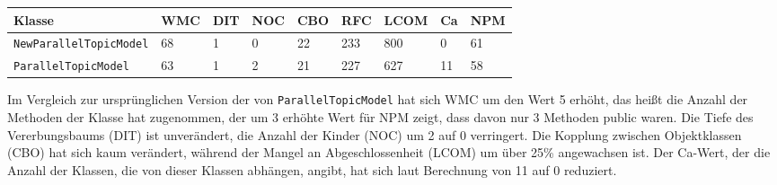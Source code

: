 \documentclass{scrreprt}
\newcommand{\lstx}[1]{\lstinline$#1$}
\begin{document}
\begin{center}
\begin{tabular}{lllllllll}
\toprule
Klasse & WMC & DIT & NOC & CBO & RFC & LCOM & Ca & NPM \\
\midrule
\lstx{NewParallelTopicModel} & 68 & 1 & 0 & 22 & 233 & 800 & 0 & 61 \\
\lstx{ParallelTopicModel} & 63 & 1 & 2 & 21 & 227 & 627 & 11 & 58 \\
\bottomrule
\end{tabular}
\end{center}

Im Vergleich zur ursprünglichen Version der von \lstx{ParallelTopicModel} hat sich WMC um den Wert 5 erhöht, das heißt die Anzahl der Methoden der Klasse hat zugenommen, der um 3 erhöhte Wert für NPM zeigt, dass davon nur 3 Methoden public waren. Die Tiefe des Vererbungsbaums (DIT) ist unverändert, die Anzahl der Kinder (NOC) um 2 auf 0 verringert. Die Kopplung zwischen Objektklassen (CBO) hat sich kaum verändert, während der Mangel an Abgeschlossenheit (LCOM) um über 25\% angewachsen ist. Der Ca-Wert, der die Anzahl der Klassen, die von dieser Klassen abhängen, angibt, hat sich laut Berechnung von 11 auf 0 reduziert. %
\end{document}
